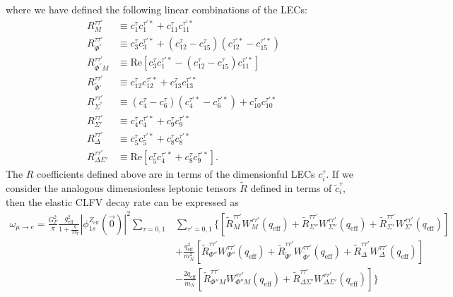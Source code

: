 \documentclass{book}[12pt]
\begin{document}
where we have defined the following linear combinations of the LECs:
\begin{equation}
\begin{split}
R_M^{\tau\tau'}&\equiv c_1^{\tau}c_1^{\tau'*}+c_{11}^{\tau}c_{11}^{\tau'*}\\
R_{\Phi^{''}}^{\tau\tau'}&\equiv c_3^{\tau}c_3^{\tau'*}+\left(c^{\tau}_{12}-c_{15}^{\tau}\right)\left(c_{12}^{\tau'*}-c_{15}^{\tau'*}\right)\\
R^{\tau\tau'}_{\Phi^{''}M}&\equiv \mathrm{Re}\left[c_3^{\tau}c_1^{\tau'*}-(c_{12}^{\tau}-c_{15}^{\tau})c_{11}^{\tau'*}\right]\\
R_{\tilde{\Phi}'}^{\tau\tau'}&\equiv c_{12}^{\tau}c_{12}^{\tau'*}+c_{13}^{\tau}c_{13}^{\tau'*}\\
R_{\Sigma^{''}}^{\tau\tau'}&\equiv (c_4^{\tau}-c_6^{\tau})(c_4^{\tau'*}-c_6^{\tau'*})+c_{10}^{\tau}c_{10}^{\tau'*}\\
R_{\Sigma'}^{\tau\tau'}&\equiv c_4^{\tau}c_4^{\tau'*}+c_9^{\tau}c_9^{\tau'*}\\
R_{\Delta}^{\tau\tau'}&\equiv c_5^{\tau}c_5^{\tau'*}+c_8^{\tau}c_8^{\tau'*}\\
R_{\Delta\Sigma'}^{\tau\tau'}&\equiv \mathrm{Re}\left[c_5^{\tau}c_4^{\tau'*}+c_8^{\tau}c_9^{\tau'*}\right].
\end{split}
\end{equation}
The $R$ coefficients defined above are in terms of the dimensionful LECs $c_i^{\tau}$. If we consider the analogous dimensionless leptonic tensors $\tilde{R}$ defined in terms of $\tilde{c}_i^{\tau}$, then the elastic CLFV decay rate can be expressed as 
\begin{equation}
\begin{split}
\omega_{\mu\rightarrow e}=\frac{G_F^2}{\pi}\frac{q_\mathrm{eff}^2}{1+\frac{q}{M_T}}|\phi_{1s}^{Z_\mathrm{eff}}(\vec{0})|^2\sum_{\tau=0,1}&\sum_{\tau'=0,1}\Bigg\{\left[\tilde{R}_M^{\tau\tau'}W_M^{\tau\tau'}(q_\mathrm{eff})+\tilde{R}_{\Sigma''}^{\tau\tau'}W_{\Sigma''}^{\tau\tau'}(q_\mathrm{eff})+\tilde{R}_{\Sigma'}^{\tau\tau'}W_{\Sigma'}^{\tau\tau'}(q_\mathrm{eff})\right]\\
&+\frac{q_\mathrm{eff}^2}{m_N^2}\left[\tilde{R}_{\Phi''}^{\tau\tau'}W_{\Phi''}^{\tau\tau'}(q_\mathrm{eff})+\tilde{R}_{\tilde{\Phi}'}^{\tau\tau'}W_{\tilde{\Phi}'}^{\tau\tau'}(q_\mathrm{eff})+\tilde{R}_{\Delta}^{\tau\tau'}W_{\Delta}^{\tau\tau'}(q_\mathrm{eff})\right]\\
&-\frac{2q_\mathrm{eff}}{m_N}\left[\tilde{R}_{\Phi'' M}^{\tau\tau'}W_{\Phi'' M}^{\tau\tau'}(q_\mathrm{eff})+\tilde{R}_{\Delta\Sigma'}^{\tau\tau'}W_{\Delta\Sigma'}^{\tau\tau'}(q_\mathrm{eff})\right]\Bigg\}
\end{split}
\label{eq:mu2e_rate}
\end{equation}
\end{document}
